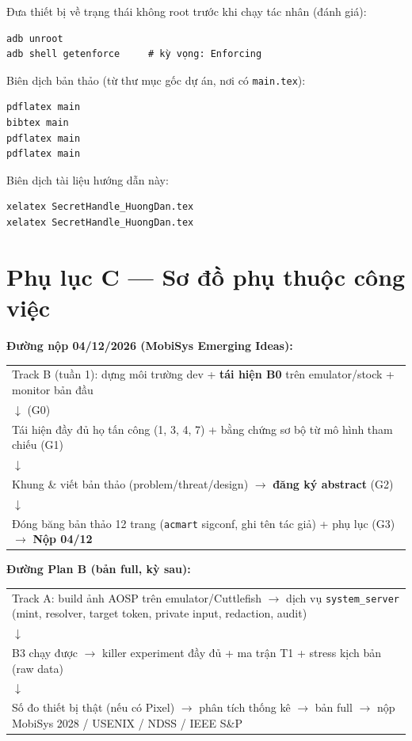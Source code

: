 \documentclass[11pt,a4paper]{article}
\newcommand{\code}[1]{\texttt{\small #1}}
\begin{document}
Đưa thiết bị về trạng thái không root trước khi chạy tác nhân (đánh giá):
\begin{verbatim}
adb unroot
adb shell getenforce     # kỳ vọng: Enforcing
\end{verbatim}

Biên dịch bản thảo (từ thư mục gốc dự án, nơi có \code{main.tex}):
\begin{verbatim}
pdflatex main
bibtex main
pdflatex main
pdflatex main
\end{verbatim}

Biên dịch tài liệu hướng dẫn này:
\begin{verbatim}
xelatex SecretHandle_HuongDan.tex
xelatex SecretHandle_HuongDan.tex
\end{verbatim}

\section{Phụ lục C --- Sơ đồ phụ thuộc công việc}

\noindent\textbf{Đường nộp 04/12/2026 (MobiSys Emerging Ideas):}
\begin{center}
\begin{tabularx}{\textwidth}{@{}>{\centering\arraybackslash}X@{}}
\toprule
Track B (tuần 1): dựng môi trường dev + \textbf{tái hiện B0} trên emulator/stock + monitor bản đầu \\
$\downarrow$ \quad (G0) \\
Tái hiện đầy đủ họ tấn công (1, 3, 4, 7) + bằng chứng sơ bộ từ mô hình tham chiếu \quad (G1) \\
$\downarrow$ \\
Khung \& viết bản thảo (problem/threat/design) $\rightarrow$ \textbf{đăng ký abstract} \quad (G2) \\
$\downarrow$ \\
Đóng băng bản thảo 12 trang (\code{acmart} sigconf, ghi tên tác giả) + phụ lục \quad (G3) $\rightarrow$ \textbf{Nộp 04/12} \\
\bottomrule
\end{tabularx}
\end{center}

\noindent\textbf{Đường Plan B (bản full, kỳ sau):}
\begin{center}
\begin{tabularx}{\textwidth}{@{}>{\centering\arraybackslash}X@{}}
\toprule
Track A: build ảnh AOSP trên emulator/Cuttlefish $\rightarrow$ dịch vụ \code{system\_server} (mint, resolver, target token, private input, redaction, audit) \\
$\downarrow$ \\
B3 chạy được $\rightarrow$ killer experiment đầy đủ + ma trận T1 + stress kịch bản (raw data) \\
$\downarrow$ \\
Số đo thiết bị thật (nếu có Pixel) $\rightarrow$ phân tích thống kê $\rightarrow$ bản full $\rightarrow$ nộp MobiSys 2028 / USENIX / NDSS / IEEE S\&P \\
\bottomrule
\end{tabularx}
\end{center}
\end{document}
